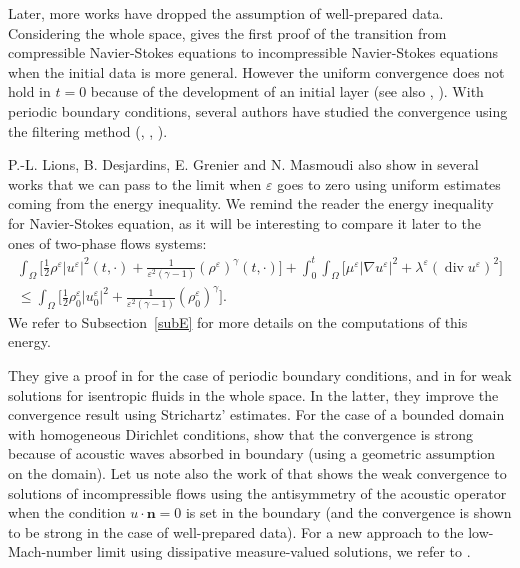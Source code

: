\documentclass[11pt, twoside, a4paper]{article}
\theoremstyle{plain}
\theoremstyle{remark}
\numberwithin{equation}{section}
\renewcommand{\div}{\operatorname{div}}
\renewcommand{\leq}{\leqslant}\renewcommand{\le}{\leqslant}
\newcommand{\eps}{\varepsilon}
\begin{document}
Later, more works have dropped the assumption of well-prepared data. Considering the whole space, \cite{ukai1986incompressible} gives the first proof of the transition from compressible Navier-Stokes equations to incompressible Navier-Stokes equations when the initial data is more general. However the uniform convergence does not hold in $t=0$ because of the development of an initial layer (see also \cite{iguchi1997incompressible}, \cite{isozaki1986singular}). With periodic boundary conditions, several authors have studied the convergence using the filtering method (\cite{danchin2002zero}, \cite{grenier1997oscillatory}, \cite{gallagher1998asymptotic}).

P.-L. Lions, B. Desjardins, E. Grenier and N. Masmoudi also show in several works that we can pass to the limit when $\eps$ goes to zero using uniform estimates coming from the energy inequality. We remind the reader the energy inequality for Navier-Stokes equation, as it will be interesting to compare it later to the ones of two-phase flows systems:
\begin{multline} \label{energie1}
    \int_\Omega \biggl[\frac{1}{2} \rho^\eps \lvert u^\eps \rvert^2(t,\cdot) + \frac{1}{\eps^2 (\gamma-1)} (\rho^\eps)^\gamma (t,\cdot)\biggr] + \int_0^t\!\!\!  \int_\Omega \biggl[\mu^\eps \lvert \nabla u^\eps \rvert^2 + \lambda^\eps (\div u^\eps)^2\biggr] \\
    \leq \int_\Omega \biggl[\frac{1}{2} \rho_0^\eps \lvert u_0^\eps \rvert^2 + \frac{1}{\eps^2(\gamma-1)} (\rho_0^\eps)^\gamma\biggr].
\end{multline}
We refer to Subsection~\ref{subE} for more details on the computations of this energy.

They give a proof in \cite{lions1998incompressible} for the case of periodic boundary conditions, and in \cite{desjardins1999low} for weak solutions for isentropic fluids in the whole space. In the latter, they improve the convergence result using Strichartz' estimates. For the case of a bounded domain with homogeneous Dirichlet conditions, \cite{desjardins1999incompressible} show that the convergence is strong because of acoustic waves absorbed in boundary (using a geometric assumption on the domain). Let us note also the work of \cite{secchi2000singular} that shows the weak convergence to solutions of incompressible flows using the antisymmetry of the acoustic operator when the condition $u \cdot \mathbf{n} =0$ is set in the boundary (and the convergence is shown to be strong in the case of well-prepared data). For a new approach to the low-Mach-number limit using dissipative measure-valued solutions, we refer to \cite{feireisl2019low}.
\end{document}
